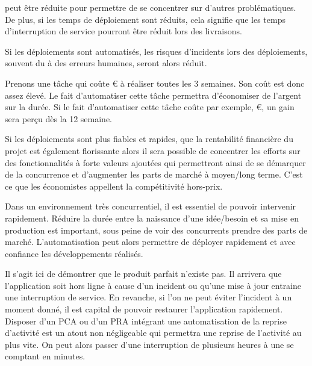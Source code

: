 \begin{description}
	\setlength\itemsep{0em}
	\item [La durée de de déploiement] peut être réduite pour permettre de se concentrer sur d'autres problématiques. De plus, si les temps de déploiement sont réduits, cela signifie que les temps d'interruption de service pourront être réduit lors des livraisons.
	\item [Erreur de déploiement] Si les déploiements sont automatisés, les risques d'incidents lors des déploiements, souvent du à des erreurs humaines, seront alors réduit.
	\item [Rentabilité financière] Prenons une tâche qui coûte € à réaliser toutes les 3 semaines. Son coût est donc assez élevé. Le fait d'automatiser cette tâche permettra d'économiser de l'argent sur la durée. Si le fait d'automatiser cette tâche coûte par exemple, €, un gain sera perçu dès la 12 semaine.\label{ref-rentabilite-finance}
	\item [Part de marché] Si les déploiements sont plus fiables et rapides, que la rentabilité financière du projet est également florissante alors il sera possible de concentrer les efforts sur des fonctionnalités à forte valeurs ajoutées qui permettront ainsi de se démarquer de la concurrence et d'augmenter les parts de marché à moyen/long terme. C'est ce que les économistes appellent la compétitivité hors-prix.
	\item [\Gls{timetomarket}] Dans un environnement très concurrentiel, il est essentiel de pouvoir intervenir rapidement. Réduire la durée entre la naissance d'une idée/besoin et sa mise en production est important, sous peine de voir des concurrents prendre des parts de marché. L'automatisation peut alors permettre de déployer rapidement et avec confiance les développements réalisés.
	\item [Reprise d'activité] Il s'agit ici de démontrer que le produit parfait n'existe pas. Il arrivera que l'application soit hors ligne à cause d'un incident ou qu'une mise à jour entraine une interruption de service. En revanche, si l'on ne peut éviter l'incident à un moment donné, il est capital de pouvoir restaurer l'application rapidement. Disposer d'un \gls{PCA} ou d'un \gls{PRA} intégrant une automatisation de la reprise d'activité est un atout non négligeable qui permettra une reprise de l'activité au plus vite. On peut alors passer d'une interruption de plusieurs heures à une se comptant en minutes.\label{ref-pra}
\end{description}

